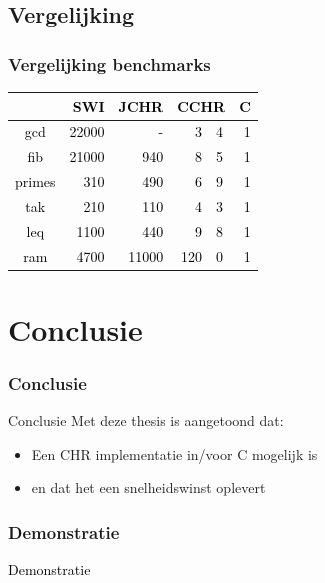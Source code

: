 \documentclass{beamer}
\newcommand{\cFront}[1]{\textcolor{black}{#1}}
\begin{document}
\subsection{Vergelijking}

\begin{frame}
\frametitle{Vergelijking benchmarks}
\begin{center}
\cFront{\begin{tabular}{|c|rrr@{.}lr|}
\hline
 & {\bf SWI} & {\bf JCHR} & \multicolumn{2}{c}{\bf CCHR} & {\bf C} \\
\hline
gcd    & 22000 & -     &   3&4  & 1 \\
fib    & 21000 & 940   &   8&5  & 1 \\
primes & 310   & 490   &   6&9  & 1 \\
tak    & 210   & 110   &   4&3  & 1 \\
leq    & 1100  & 440   &   9&8  & 1 \\
ram    & 4700  & 11000 &  120&0 & 1 \\
\hline
\end{tabular}}
\end{center}
\end{frame}

\section{Conclusie}

\begin{frame}
  \frametitle{Conclusie}
  \begin{block}{Conclusie}
    Met deze thesis is aangetoond dat:
    \begin{itemize}
      \item Een CHR implementatie in/voor C mogelijk is
      \item en dat het een snelheidswinst oplevert
    \end{itemize}
  \end{block}
\end{frame}

\begin{frame}
  \frametitle{Demonstratie}
  \cFront{Demonstratie}
\end{frame}
\end{document}
